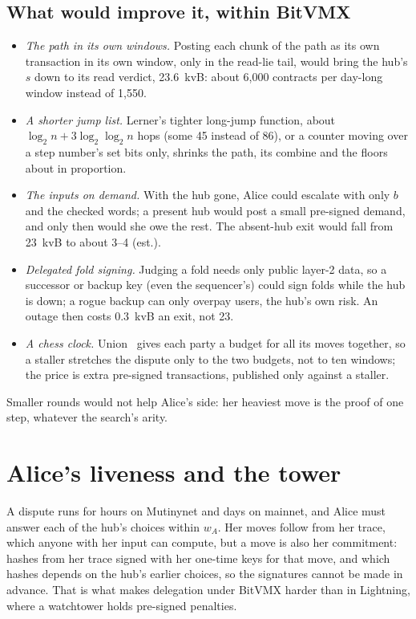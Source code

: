 \documentclass[11pt]{article}
\begin{document}
\subsection{What would improve it, within BitVMX}

\begin{itemize}[leftmargin=1.5em]
\item \emph{The path in its own windows.} Posting each chunk of the
  path as its own transaction in its own window, only in the read-lie
  tail, would bring the hub's $s$ down to its read verdict, 23.6~kvB:
  about 6,000 contracts per day-long window instead of 1,550.
\item \emph{A shorter jump list.} Lerner's tighter long-jump function,
  about $\log_2 n + 3\log_2\log_2 n$ hops (some 45 instead of 86), or a
  counter moving over a step number's set bits only, shrinks the path,
  its combine and the floors about in proportion.
\item \emph{The inputs on demand.} With the hub gone, Alice could
  escalate with only $b$ and the checked words; a present hub would
  post a small pre-signed demand, and only then would she owe the rest.
  The absent-hub exit would fall from 23~kvB to about 3--4 (est.).
\item \emph{Delegated fold signing.} Judging a fold needs only public
  layer-2 data, so a successor or backup key (even the sequencer's) could
  sign folds while the hub is down; a rogue backup can only overpay
  users, the hub's own risk. An outage then costs 0.3~kvB an exit, not
  23.
\item \emph{A chess clock.} Union~\cite{union} gives each party a budget
  for all its moves together, so a staller stretches the dispute only to
  the two budgets, not to ten windows; the price is extra pre-signed
  transactions, published only against a staller.
\end{itemize}
Smaller rounds would not help Alice's side: her heaviest move is the
proof of one step, whatever the search's arity.

\section{Alice's liveness and the tower}
\label{sec:tower}

A dispute runs for hours on Mutinynet and days on mainnet, and Alice
must answer each of the hub's choices within $w_A$. Her moves follow
from her trace, which anyone with her input can compute, but a move is
also her commitment: hashes from her trace signed with her one-time keys
for that move, and which hashes depends on the hub's earlier choices, so
the signatures cannot be made in advance. That is what makes delegation
under BitVMX harder than in Lightning, where a watchtower holds
pre-signed penalties.
\end{document}
